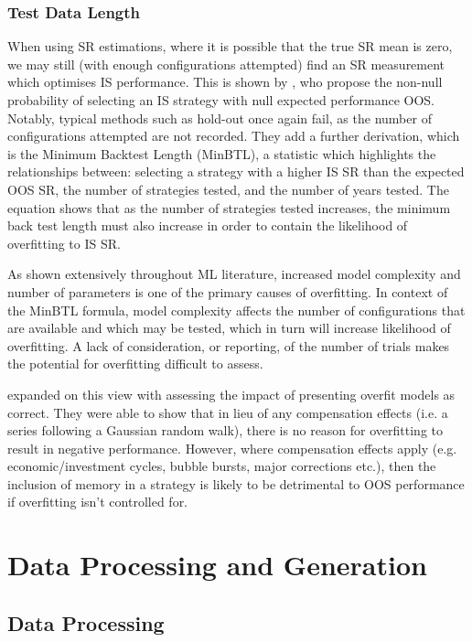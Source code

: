 \documentclass[a4paper,11pt,oneside]{article}
\theoremstyle{plain}
\theoremstyle{definition}
\begin{document}
	\subsubsection{Test Data Length}

	When using SR estimations, where it is possible that the true SR mean is 
	zero, we may still (with enough configurations attempted) find an SR measurement which optimises IS performance. 
	This is shown by \citet{BaileyBTL}, who propose the non-null probability of selecting an IS strategy with null expected 
	performance OOS. Notably, typical methods such as hold-out once again fail, as the number of configurations 
	attempted are not recorded. They add a further derivation, which is the Minimum Backtest Length (MinBTL), a statistic which highlights the relationships between: selecting a strategy with a higher IS SR than the expected OOS SR, 
	the number of strategies tested, and the number of years tested. The equation shows that  as the number 
	of strategies tested increases, the minimum back test length must also increase in order to contain the likelihood 
	of overfitting to IS SR. 
	\hfill \break 
	
	As shown extensively throughout ML literature, increased model complexity and number of parameters is one of 
	the primary causes of overfitting. In context of the MinBTL formula, model complexity affects the number of 
	configurations that are available and which may be tested, which in turn will increase likelihood of overfitting. 
	A lack of consideration, or reporting, of the number of trials makes the potential for overfitting difficult to assess. 
	\hfill \break 
	
	\citet{BaileyBTL} expanded on this view with assessing the impact of presenting overfit models as correct. 
	They were able to show that in lieu of any compensation effects (i.e. a series following a Gaussian random walk), 
	there is no reason for overfitting to result in negative performance. However, where compensation effects apply 
	(e.g. economic/investment cycles, bubble bursts, major corrections etc.), then the inclusion of memory in a strategy
	is likely to be detrimental to OOS performance if overfitting isn't controlled for.
	\hfill \break 
	
	\newpage
	
	\section{Data Processing and Generation }\label{Data}
	\subsection{Data Processing}\label{data_processing}
	
\end{document}
